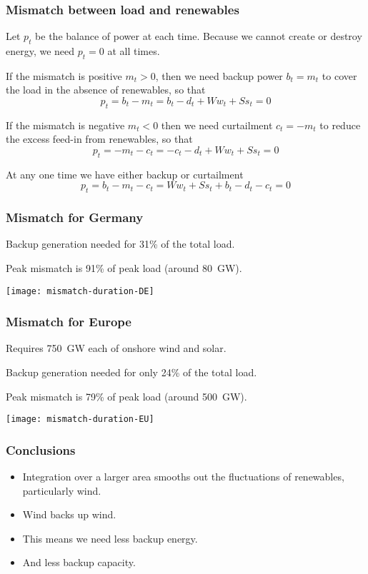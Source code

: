 \documentclass[10pt,aspectratio=169,dvipsnames]{beamer}
\let\olditem\item
\renewcommand{\item}{%
\olditem\vspace{5pt}}
\begin{document}
\begin{frame}
  \frametitle{Mismatch between load and renewables}

  Let $p_t$ be the balance of power at each time. Because we cannot
  create or destroy energy, we need $p_t = 0$ at all times.

  If the mismatch is positive $m_t > 0$, then we need \alert{backup power} $b_t = m_t$
  to cover the load in the absence of renewables, so that
  \begin{equation*}
    p_t = b_t - m_t =  b_t - d_t  + Ww_t + Ss_t = 0
  \end{equation*}

  If the mismatch is negative $m_t < 0$ then we need \alert{curtailment} $c_t = -m_t$
  to reduce the excess feed-in from renewables, so that
  \begin{equation*}
    p_t =  - m_t - c_t = -c_t - d_t + Ww_t + Ss_t = 0
  \end{equation*}

  At any one time we have either backup or curtailment
  \begin{equation*}
    p_t = b_t - m_t - c_t = Ww_t + Ss_t + b_t - d_t - c_t = 0
  \end{equation*}


\end{frame}

\begin{frame}
  \frametitle{Mismatch for Germany}

  Backup generation needed for 31\% of the total load.

  Peak mismatch is 91\% of peak load (around 80~GW).

  \centering
  \texttt{[image: mismatch-duration-DE]}


\end{frame}



\begin{frame}
  \frametitle{Mismatch for Europe}

  Requires 750~GW each of onshore wind and solar.

  Backup generation needed for only 24\% of the total load.

  Peak mismatch is 79\% of peak load (around 500~GW).

  \centering
  \texttt{[image: mismatch-duration-EU]}


\end{frame}


\begin{frame}
  \frametitle{Conclusions}

  \begin{itemize}
  \item Integration over a larger area smooths out the fluctuations of
    renewables, particularly wind.
  \item Wind backs up wind.
  \item This means we need \alert{less backup energy}.
  \item And \alert{less backup capacity}.
  \end{itemize}


\end{frame}
\end{document}
